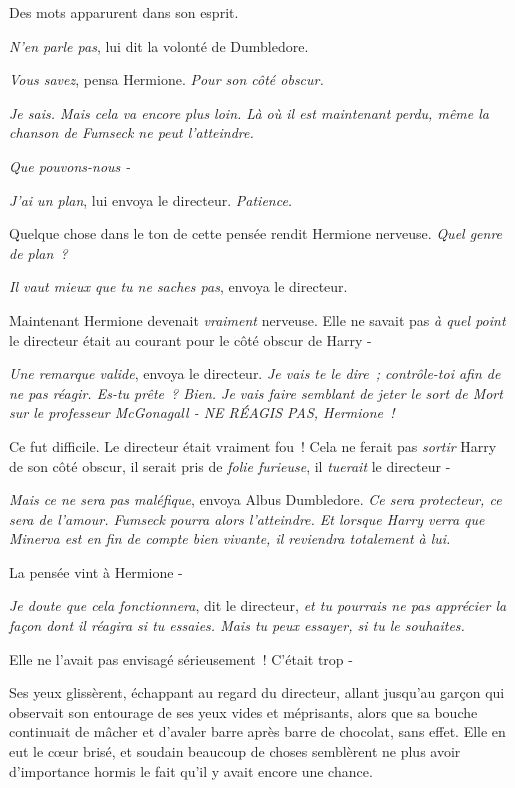 Des mots apparurent dans son esprit.

\emph{N'en parle pas}, lui dit la volonté de Dumbledore.

\emph{Vous savez}, pensa Hermione. \emph{Pour son côté obscur.}

\emph{Je sais. Mais cela va encore plus loin. Là où il est maintenant perdu, même la chanson de Fumseck ne peut l'atteindre.}

\emph{Que pouvons-nous -}

\emph{J'ai un plan}, lui envoya le directeur. \emph{Patience.}

Quelque chose dans le ton de cette pensée rendit Hermione nerveuse. \emph{Quel genre de plan~?}

\emph{Il vaut mieux que tu ne saches pas}, envoya le directeur.

Maintenant Hermione devenait \emph{vraiment} nerveuse. Elle ne savait pas \emph{à quel point} le directeur était au courant pour le côté obscur de Harry -

\emph{Une remarque valide}, envoya le directeur. \emph{Je vais te le dire~; contrôle-toi afin de ne pas réagir. Es-tu prête~? Bien. Je vais faire semblant de jeter le sort de Mort sur le professeur McGonagall - NE RÉAGIS PAS, Hermione~!}

Ce fut difficile. Le directeur était vraiment fou~! Cela ne ferait pas \emph{sortir} Harry de son côté obscur, il serait pris de \emph{folie furieuse}, il \emph{tuerait} le directeur -

\emph{Mais ce ne sera pas maléfique}, envoya Albus Dumbledore. \emph{Ce sera protecteur, ce sera de l'amour. Fumseck pourra alors l'atteindre. Et lorsque Harry verra que Minerva est en fin de compte bien vivante, il reviendra totalement à lui.}

La pensée vint à Hermione -

\emph{Je doute que cela fonctionnera}, dit le directeur, \emph{et tu pourrais ne pas apprécier la façon dont il réagira si tu essaies. Mais tu peux essayer, si tu le souhaites.}

Elle ne l'avait pas envisagé sérieusement~! C'était trop -

Ses yeux glissèrent, échappant au regard du directeur, allant jusqu'au garçon qui observait son entourage de ses yeux vides et méprisants, alors que sa bouche continuait de mâcher et d'avaler barre après barre de chocolat, sans effet. Elle en eut le cœur brisé, et soudain beaucoup de choses semblèrent ne plus avoir d'importance hormis le fait qu'il y avait encore une chance.

